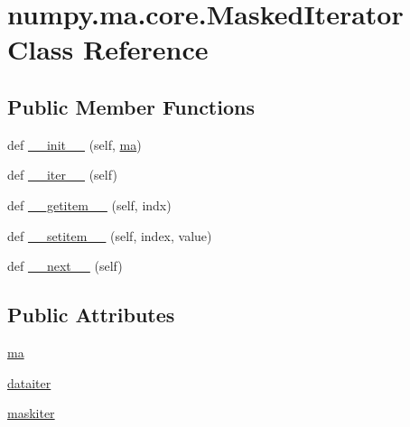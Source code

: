 \hypertarget{classnumpy_1_1ma_1_1core_1_1MaskedIterator}{}\section{numpy.\+ma.\+core.\+Masked\+Iterator Class Reference}
\label{classnumpy_1_1ma_1_1core_1_1MaskedIterator}
\subsection*{Public Member Functions}
\begin{DoxyCompactItemize}
\item 
def \hyperlink{classnumpy_1_1ma_1_1core_1_1MaskedIterator_a463c3a68c63c19d1f930f176e0d112da}{\+\_\+\+\_\+init\+\_\+\+\_\+} (self, \hyperlink{classnumpy_1_1ma_1_1core_1_1MaskedIterator_abdc7ff042b9f1cc315be20ec7ded9556}{ma})
\item 
def \hyperlink{classnumpy_1_1ma_1_1core_1_1MaskedIterator_a679059e4938b24a77c156ee3842e64db}{\+\_\+\+\_\+iter\+\_\+\+\_\+} (self)
\item 
def \hyperlink{classnumpy_1_1ma_1_1core_1_1MaskedIterator_a230491e9cf0be21a50ca2453bd0e08b5}{\+\_\+\+\_\+getitem\+\_\+\+\_\+} (self, indx)
\item 
def \hyperlink{classnumpy_1_1ma_1_1core_1_1MaskedIterator_a9d010e3bb8b98b905e2eb658a376544d}{\+\_\+\+\_\+setitem\+\_\+\+\_\+} (self, index, value)
\item 
def \hyperlink{classnumpy_1_1ma_1_1core_1_1MaskedIterator_ad6e087a8c1178f7a4e9a5bbd39280fdc}{\+\_\+\+\_\+next\+\_\+\+\_\+} (self)
\end{DoxyCompactItemize}
\subsection*{Public Attributes}
\begin{DoxyCompactItemize}
\item 
\hyperlink{classnumpy_1_1ma_1_1core_1_1MaskedIterator_abdc7ff042b9f1cc315be20ec7ded9556}{ma}
\item 
\hyperlink{classnumpy_1_1ma_1_1core_1_1MaskedIterator_a863465dfe0e9e0f22c2e69e3531b47b7}{dataiter}
\item 
\hyperlink{classnumpy_1_1ma_1_1core_1_1MaskedIterator_a24d2362de9cd2c46a023d29b3b956dfb}{maskiter}
\end{DoxyCompactItemize}



